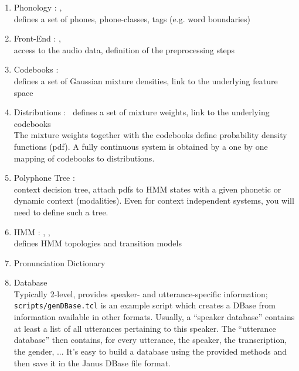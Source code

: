 \begin{enumerate}

\item Phonology : , \\
  defines a set of phones, phone-classes, tags (e.g. word boundaries)

\item Front-End : , \\
  access to the audio data, definition of the preprocessing steps

\item Codebooks : \\
  defines a set of Gaussian mixture densities, link to the underlying feature space

\item Distributions : \
  defines a set of mixture weights, link to the underlying codebooks\\
  The mixture weights together with the codebooks define probability
  density functions (pdf). A  fully continuous system is obtained by 
  a one by one mapping of codebooks to distributions.

\item Polyphone Tree : \\
 context decision tree, attach pdfs to HMM states with a given
 phonetic or dynamic context (modalities). Even for context independent systems,
 you will need to define such a tree.

\item HMM : , , \\
  defines HMM topologies and transition models

\item Pronunciation Dictionary 

\item Database\\
  Typically   2-level,  provides    speaker-   and  utterance-specific
  information; \texttt{scripts/genDBase.tcl}      is an example script
  which creates  a  DBase  from    information  available in     other
  formats. Usually, a ``speaker database'' contains at least a list of
  all  utterances pertaining   to   this speaker.   The    ``utterance
  database'' then  contains,  for  every utterance, the   speaker, the
  transcription,  the gender, ... It's  easy to build a database using
  the provided methods and then save it in the Janus DBase file format.

\end{enumerate}

